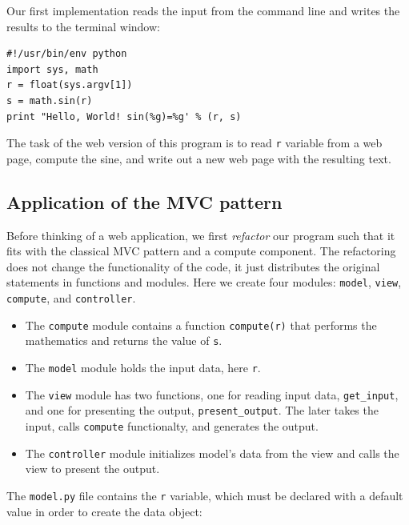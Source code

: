 \documentclass[%
oneside,                 %
final,                   %
10pt]{article}
\begin{document}
Our first implementation reads the input from the command
line and writes the results to the terminal window:

\begin{Verbatim}[numbers=none,fontsize=\fontsize{9pt}{9pt},baselinestretch=0.85]
#!/usr/bin/env python
import sys, math
r = float(sys.argv[1])
s = math.sin(r)
print "Hello, World! sin(%g)=%g' % (r, s)
\end{Verbatim}

The task of the web version of this program is to read \Verb!r!
variable from a web page, compute the sine,
and write out a new web page with the resulting text.

\subsection{Application of the MVC pattern}
\label{wf:hw:mvc}



Before thinking of a web application, we first \emph{refactor} our program
such that it fits with the classical MVC pattern and a compute component.
The refactoring does not change the functionality of the code, it
just distributes the original statements in functions and modules.
Here we create four modules: \Verb!model!, \Verb!view!,
\Verb!compute!, and \Verb!controller!.

\begin{itemize}
 \item The \Verb!compute! module contains a function \Verb!compute(r)! that performs
   the mathematics and returns the value of \Verb!s!.

 \item The \Verb!model! module holds the input data, here \Verb!r!.

 \item The \Verb!view! module has two functions, one for reading input data,
   \Verb!get_input!,
   and one for presenting the output, \Verb!present_output!.
   The later takes the input, calls \Verb!compute! functionalty, and
   generates the output.

 \item The \Verb!controller! module initializes model's data from the view
   and calls the view to present the output.
\end{itemize}

\noindent
The \Verb!model.py! file contains the \Verb!r! variable, which must
be declared with a default value in order to create the data object:
\end{document}
